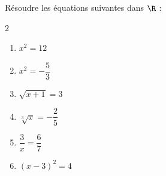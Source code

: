 \begin{exo}{}
	Résoudre les équations suivantes dans $\R$ :
	\vspace*{-2mm}
	\begin{multicols}{2}
		\begin{enumerate}[itemsep=2mm]
			\item $x^2 = 12$
			\item $x^2 = -\dfrac{5}{3}$
			\item $\sqrt{x+1} = 3$
			\item $\sqrt[3]{x} = -\dfrac{2}{5}$
			\item $\dfrac{3}{x} = \dfrac{6}{7}$
			\item $(x-3)^2 = 4$
		\end{enumerate}
	\end{multicols}\vspace*{-2mm}
\end{exo}
